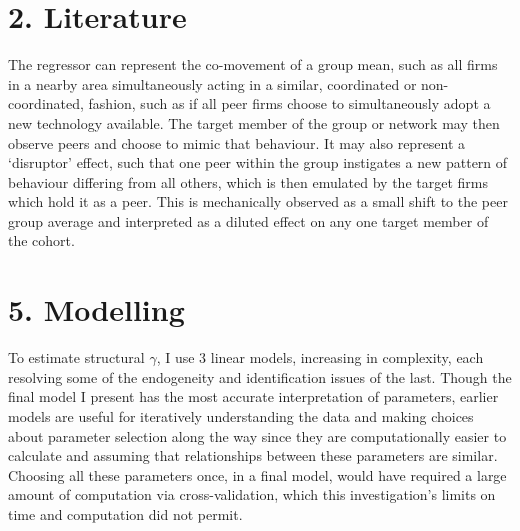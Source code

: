 \section{2. Literature}

The regressor can represent the co-movement of a group mean, such as all firms in a nearby
area simultaneously acting in a similar, coordinated or non-coordinated, fashion,
such as if all peer firms choose to simultaneously adopt a new technology available.
The target member of the group or network may then observe peers
and choose to mimic that behaviour.
It may also represent a `disruptor' effect,
such that one peer within the group instigates a new pattern of behaviour differing from all others,
which is then emulated by the target firms which hold it as a peer.
This is mechanically observed as a small shift to the peer group average
and interpreted as a diluted effect on any one target member of the cohort.

\section{5. Modelling}

To estimate structural $\gamma$, I use 3 linear models, increasing in complexity,
each resolving some of the endogeneity and identification issues of the last.
Though the final model I present has the most accurate interpretation of parameters,
earlier models are useful for iteratively understanding the data
and making choices about parameter selection along the way
since they are computationally easier to calculate and
assuming that relationships between these parameters are similar.
Choosing all these parameters once, in a final model, would have required
a large amount of computation via cross-validation,
which this investigation's limits on time and computation did not permit.

